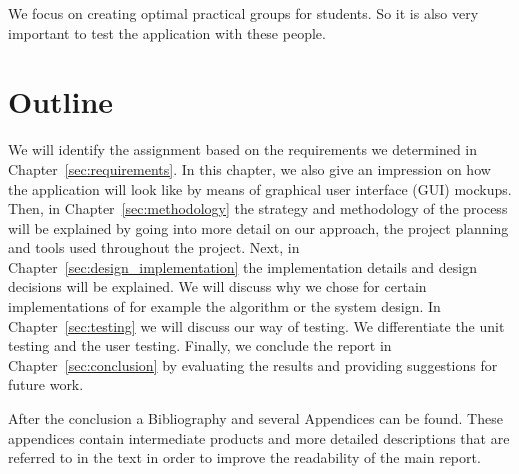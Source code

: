 We focus on creating optimal practical groups for students.
So it is also very important to test the application with these people.

\section{Outline}
We will identify the assignment based on the requirements we determined in Chapter~\ref{sec:requirements}. 
In this chapter, we also give an impression on how the application will look like by means of graphical user interface (GUI) mockups.
Then, in Chapter~\ref{sec:methodology} the strategy and methodology of the process will be explained by going into more detail on our approach, the project planning and tools used throughout the project.
Next, in Chapter~\ref{sec:design_implementation} the implementation details and design decisions will be explained.
We will discuss why we chose for certain implementations of for example the algorithm or the system design.
In Chapter~\ref{sec:testing} we will discuss our way of testing. 
We differentiate the unit testing and the user testing.
Finally, we conclude the report in Chapter~\ref{sec:conclusion} by evaluating the results and providing suggestions for future work.

After the conclusion a Bibliography and several Appendices can be found. 
These appendices contain intermediate products and more detailed descriptions that are referred to in the text in order to improve the readability of the main report.
